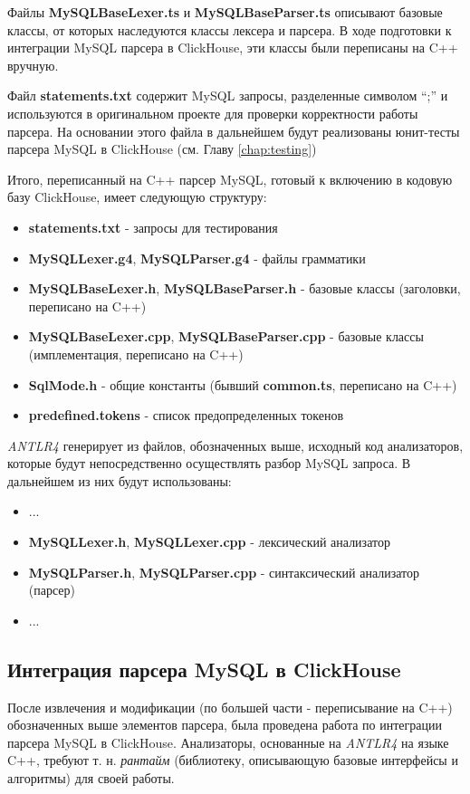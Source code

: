 Файлы \textbf{MySQLBaseLexer.ts} и \textbf{MySQLBaseParser.ts} описывают базовые классы, от которых наследуются классы лексера и парсера. В ходе подготовки к интеграции MySQL парсера в ClickHouse, эти классы были переписаны на C++ вручную. 

Файл \textbf{statements.txt} содержит MySQL запросы, разделенные символом \enquote{;} и используются в оригинальном проекте для проверки корректности работы парсера. На основании этого файла в дальнейшем будут реализованы юнит-тесты парсера MySQL в ClickHouse (см. Главу \ref{chap:testing})

Итого, переписанный на C++ парсер MySQL, готовый к включению в кодовую базу ClickHouse, имеет следующую структуру:
\begin{itemize}
    \item \textbf{statements.txt} - запросы для тестирования
    \item \textbf{MySQLLexer.g4}, \textbf{MySQLParser.g4} - файлы грамматики
    \item \textbf{MySQLBaseLexer.h}, \textbf{MySQLBaseParser.h} - базовые классы (заголовки, переписано на C++)
    \item \textbf{MySQLBaseLexer.cpp}, \textbf{MySQLBaseParser.cpp} - базовые классы (имплементация, переписано на C++)
    \item \textbf{SqlMode.h} - общие константы (бывший \textbf{common.ts}, переписано на C++)
    \item \textbf{predefined.tokens} - список предопределенных токенов
\end{itemize}

\pagebreak

\textit{ANTLR4} генерирует из файлов, обозначенных выше, исходный код анализаторов, которые будут непосредственно осуществлять разбор MySQL запроса. В дальнейшем из них будут использованы:

\begin{itemize}
    \item ...
    \item \textbf{MySQLLexer.h}, \textbf{MySQLLexer.cpp} - лексический анализатор
    \item \textbf{MySQLParser.h}, \textbf{MySQLParser.cpp} - синтаксический анализатор (парсер)
    \item ...
\end{itemize}

\subsection{Интеграция парсера MySQL в ClickHouse}
После извлечения и модификации (по большей части - переписывание на C++) обозначенных выше элементов парсера, была проведена работа по интеграции парсера MySQL в ClickHouse. Анализаторы, основанные на \textit{ANTLR4} на языке C++, требуют т. н. \textit{рантайм} (библиотеку, описывающую базовые интерфейсы и алгоритмы) для своей работы. 

